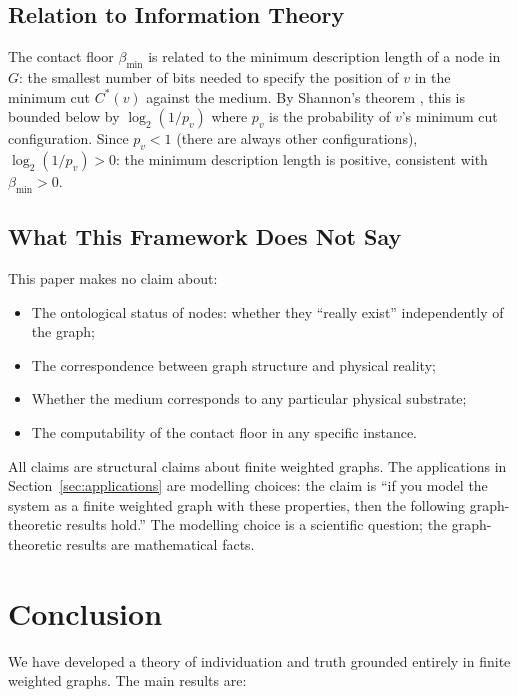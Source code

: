 \documentclass[11pt,twocolumn,a4paper]{article}
\theoremstyle{plain}
\theoremstyle{definition}
\theoremstyle{remark}
\newcommand{\bmin}{\beta_{\min}}
\begin{document}
\subsection{Relation to Information Theory}

The contact floor $\bmin$ is related to the minimum description length of
a node in $G$: the smallest number of bits needed to specify the position
of $v$ in the minimum cut $C^*(v)$ against the medium. By Shannon's theorem
\citep{shannon1948mathematical}, this is bounded below by $\log_2(1/p_v)$
where $p_v$ is the probability of $v$'s minimum cut configuration. Since
$p_v < 1$ (there are always other configurations), $\log_2(1/p_v) > 0$:
the minimum description length is positive, consistent with $\bmin > 0$.

\subsection{What This Framework Does Not Say}

This paper makes no claim about:
\begin{itemize}
  \item The ontological status of nodes: whether they ``really exist''
  independently of the graph;
  \item The correspondence between graph structure and physical reality;
  \item Whether the medium corresponds to any particular physical substrate;
  \item The computability of the contact floor in any specific instance.
\end{itemize}

All claims are structural claims about finite weighted graphs. The
applications in Section~\ref{sec:applications} are modelling choices:
the claim is ``if you model the system as a finite weighted graph with
these properties, then the following graph-theoretic results hold.'' The
modelling choice is a scientific question; the graph-theoretic results are
mathematical facts.

\section{Conclusion}
\label{sec:conclusion}

We have developed a theory of individuation and truth grounded entirely in
finite weighted graphs. The main results are:
\end{document}
